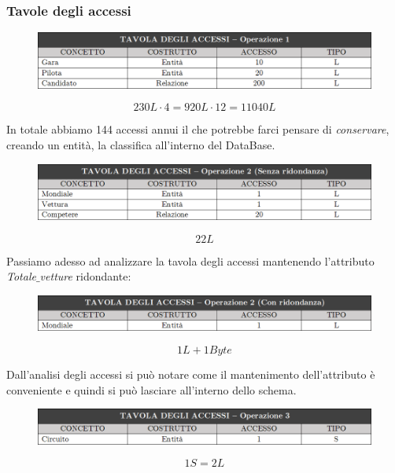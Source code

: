 \subsubsection{Tavole degli accessi}

\begin{figure}[H]
    \centering
    \includegraphics[scale = 0.74]{Images/Table/Tavola accessi - op1.png}
\end{figure}

\begin{equation*}
    230L \cdot 4 = 920L \cdot 12 = 11040L
\end{equation*}

In totale abbiamo 144 accessi annui il che potrebbe farci pensare di \emph{conservare}, creando un entità, la classifica all'interno del DataBase.

\begin{figure}[H]
    \centering
    \includegraphics[scale = 0.74]{Images/Table/Tavola accessi - op2.png}
\end{figure}

\begin{equation*}
    22L
\end{equation*}

Passiamo adesso ad analizzare la tavola degli accessi mantenendo l'attributo \emph{Totale$\_$vetture} ridondante:

\begin{figure}[H]
    \centering
    \includegraphics[scale = 0.74]{Images/Table/Tavola accessi - op2 (ridondanza).png}
\end{figure}

\begin{equation*}
    1L + 1Byte
\end{equation*}

Dall'analisi degli accessi si può notare come il mantenimento dell'attributo è conveniente e quindi si può lasciare all'interno dello schema.

\begin{figure}[H]
    \centering
    \includegraphics[scale = 0.74]{Images/Table/Tavola accessi - op3.png}
\end{figure}

\begin{equation*}
    1S = 2L
\end{equation*}